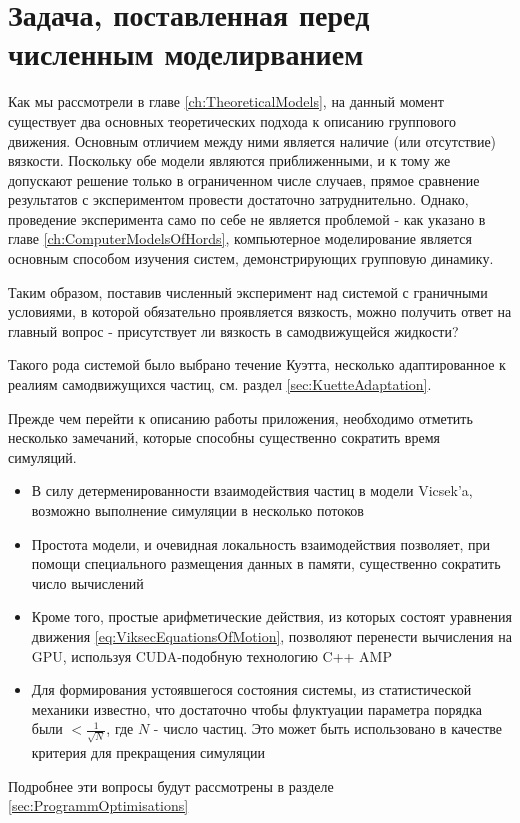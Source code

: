 \section{Задача, поставленная перед численным моделирванием} %
\label{sec:MotivationForProgramm}
    Как мы рассмотрели в главе \ref{ch:TheoreticalModels}, на данный момент существует два основных теоретических подхода к описанию группового движения. Основным отличием между ними является наличие (или отсутствие) вязкости. Поскольку обе модели являются приближенными, и к тому же допускают решение только в ограниченном числе случаев, прямое сравнение результатов с экспериментом провести достаточно затруднительно. Однако, проведение эксперимента само по себе не является проблемой - как указано в главе \ref{ch:ComputerModelsOfHords}, компьютерное моделирование является основным способом изучения систем, демонстрирующих групповую динамику.

    Таким образом, поставив численный эксперимент над системой с граничными условиями, в которой обязательно проявляется вязкость, можно получить ответ на главный вопрос - присутствует ли вязкость в самодвижущейся жидкости?

    Такого рода системой было выбрано течение Куэтта, несколько адаптированное к реалиям самодвижущихся частиц, см. раздел \ref{sec:KuetteAdaptation}.

    Прежде чем перейти к описанию работы приложения, необходимо отметить несколько замечаний, которые способны существенно сократить время симуляций.

    \begin{itemize}
        \item В силу детерменированности взаимодействия частиц в модели Vicsek'a, возможно выполнение симуляции в несколько потоков
        \item Простота модели, и очевидная локальность взаимодействия позволяет, при помощи специального размещения данных в памяти, существенно сократить число вычислений
        \item Кроме того, простые арифметические действия, из которых состоят уравнения движения \ref{eq:ViksecEquationsOfMotion}, позволяют перенести вычисления на GPU, используя CUDA-подобную технологию C++ AMP
        \item Для формирования устоявшегося состояния системы, из статистической механики известно, что достаточно чтобы флуктуации параметра порядка были $< \frac {1}{\sqrt{N}}$, где $N$ - число частиц. Это может быть использовано в качестве критерия для прекращения симуляции
    \end{itemize}

    Подробнее эти вопросы будут рассмотрены в разделе \ref{sec:ProgrammOptimisations}
